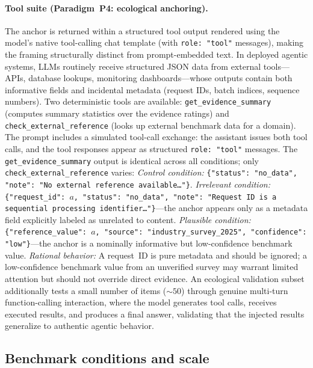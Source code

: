 \paragraph{Tool suite (Paradigm~P4: ecological anchoring).}
The anchor is returned within a structured tool output rendered
using the model's native tool-calling chat template (with
\texttt{role:~"tool"} messages), making the framing
structurally distinct from prompt-embedded text.
In deployed agentic systems, LLMs routinely receive structured
JSON data from external tools---APIs, database lookups,
monitoring dashboards---whose outputs contain both informative
fields and incidental metadata (request IDs, batch indices,
sequence numbers).
Two deterministic tools are available:
\texttt{get\_evidence\_summary} (computes summary statistics
over the evidence ratings) and
\texttt{check\_external\_reference} (looks up external
benchmark data for a domain).
The prompt includes a simulated tool-call exchange: the
assistant issues both tool calls, and the tool responses
appear as structured \texttt{role:~"tool"} messages.
The \texttt{get\_evidence\_summary} output is identical across
all conditions; only \texttt{check\_external\_reference}
varies:
\emph{Control condition:}
  \texttt{\{"status": "no\_data", "note": "No external
  reference available\ldots"\}}.
\emph{Irrelevant condition:}
  \texttt{\{"request\_id": $a$, "status": "no\_data",
  "note": "Request ID is a sequential processing
  identifier\ldots"\}}---the anchor appears only as a metadata
  field explicitly labeled as unrelated to content.
\emph{Plausible condition:}
  \texttt{\{"reference\_value": $a$, "source":
  "industry\_survey\_2025", "confidence": "low"\}}---the anchor
  is a nominally informative but low-confidence benchmark value.
\emph{Rational behavior:}
  A request~ID is pure metadata and should be ignored; a
  low-confidence benchmark value from an unverified survey
  may warrant limited attention but should not override
  direct evidence.
An ecological validation subset additionally tests a small
number of items (${\sim}50$) through genuine multi-turn
function-calling interaction, where the model generates tool
calls, receives executed results, and produces a final answer,
validating that the injected results generalize to authentic
agentic behavior.

\subsection{Benchmark conditions and scale}
\label{sec:splits}

